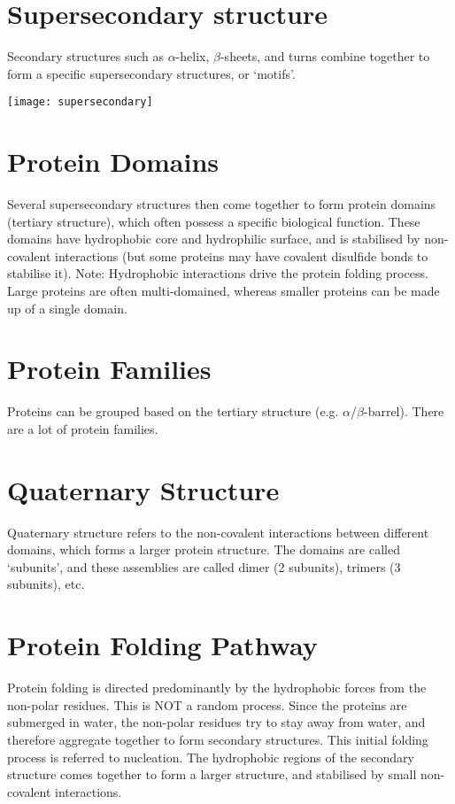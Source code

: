 \section{Supersecondary structure}

Secondary structures such as $\alpha$-helix, $\beta$-sheets, and turns combine together to form a specific supersecondary structures, or `motifs'.

\begin{center}
\texttt{[image: supersecondary]}
\end{center}

\section{Protein Domains}

Several supersecondary structures then come together to form protein domains (tertiary structure), which often possess a specific biological function.
These domains have hydrophobic core and hydrophilic surface, and is stabilised by non-covalent interactions (but some proteins may have covalent disulfide bonds to stabilise it).
Note: Hydrophobic interactions drive the protein folding process.
Large proteins are often multi-domained, whereas smaller proteins can be made up of a single domain.

\section{Protein Families}

Proteins can be grouped based on the tertiary structure (e.g. $\alpha$/$\beta$-barrel).
There are a lot of protein families.

\section{Quaternary Structure}

Quaternary structure refers to the non-covalent interactions between different domains, which forms a larger protein structure.
The domains are called `subunits', and these assemblies are called dimer (2 subunits), trimers (3 subunits), etc.

\section{Protein Folding Pathway}

Protein folding is directed predominantly by the hydrophobic forces from the non-polar residues.
This is NOT a random process.
Since the proteins are submerged in water, the non-polar residues try to stay away from water, and therefore aggregate together to form secondary structures.
This initial folding process is referred to nucleation.
The hydrophobic regions of the secondary structure comes together to form a larger structure, and stabilised by small non-covalent interactions.

